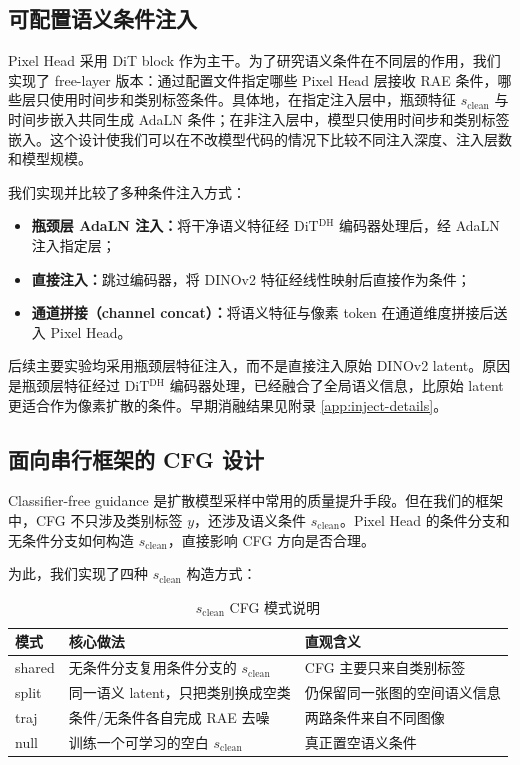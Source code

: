 \documentclass[11pt]{article}
\begin{document}
\subsection{可配置语义条件注入}

Pixel Head 采用 DiT block 作为主干。为了研究语义条件在不同层的作用，我们实现了 free-layer 版本：通过配置文件指定哪些 Pixel Head 层接收 RAE 条件，哪些层只使用时间步和类别标签条件。具体地，在指定注入层中，瓶颈特征 $s_{\mathrm{clean}}$ 与时间步嵌入共同生成 AdaLN 条件；在非注入层中，模型只使用时间步和类别标签嵌入。这个设计使我们可以在不改模型代码的情况下比较不同注入深度、注入层数和模型规模。

我们实现并比较了多种条件注入方式：
\begin{itemize}
    \item \textbf{瓶颈层 AdaLN 注入：}将干净语义特征经 DiT$^{\mathrm{DH}}$ 编码器处理后，经 AdaLN 注入指定层；
    \item \textbf{直接注入：}跳过编码器，将 DINOv2 特征经线性映射后直接作为条件；
    \item \textbf{通道拼接（channel concat）：}将语义特征与像素 token 在通道维度拼接后送入 Pixel Head。
\end{itemize}

后续主要实验均采用瓶颈层特征注入，而不是直接注入原始 DINOv2 latent。原因是瓶颈层特征经过 DiT$^{\mathrm{DH}}$ 编码器处理，已经融合了全局语义信息，比原始 latent 更适合作为像素扩散的条件。早期消融结果见附录 \ref{app:inject-details}。

\subsection{面向串行框架的 CFG 设计}

Classifier-free guidance 是扩散模型采样中常用的质量提升手段。但在我们的框架中，CFG 不只涉及类别标签 $y$，还涉及语义条件 $s_{\mathrm{clean}}$。Pixel Head 的条件分支和无条件分支如何构造 $s_{\mathrm{clean}}$，直接影响 CFG 方向是否合理。

为此，我们实现了四种 $s_{\mathrm{clean}}$ 构造方式：
\begin{table}[H]
\centering
\caption{$s_{\mathrm{clean}}$ CFG 模式说明}
\begin{tabular}{lll}
\toprule
模式 & 核心做法 & 直观含义 \\
\midrule
shared & 无条件分支复用条件分支的 $s_{\mathrm{clean}}$ & CFG 主要只来自类别标签 \\
split & 同一语义 latent，只把类别换成空类 & 仍保留同一张图的空间语义信息 \\
traj & 条件/无条件各自完成 RAE 去噪 & 两路条件来自不同图像 \\
null & 训练一个可学习的空白 $s_{\mathrm{clean}}$ & 真正置空语义条件 \\
\bottomrule
\end{tabular}
\end{table}
\end{document}
